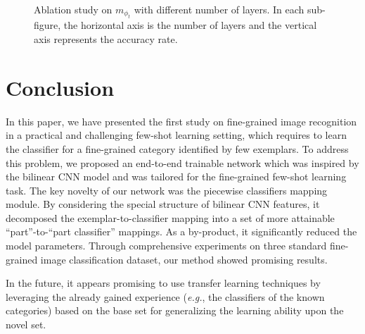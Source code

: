 \documentclass[10pt,twocolumn,letterpaper]{article}
\begin{document}
\begin{figure}[t]
 \centering
 \quad

 \quad

 \quad
 \caption{Ablation study on $m_{{\phi}_t}$ with different number of layers. In each sub-figure, the horizontal axis is the number of layers and the vertical axis represents the accuracy rate.} \label{fig:numlayers}
\end{figure}

\section{Conclusion}\label{sec:conclude}

In this paper, we have presented the first study on fine-grained image recognition in a practical and challenging few-shot learning setting, which requires to learn the classifier for a fine-grained category identified by few exemplars. To address this problem, we proposed an end-to-end trainable network which was inspired by the bilinear CNN model and was tailored for the fine-grained few-shot learning task. The key novelty of our network was the piecewise classifiers mapping module. By considering the special structure of bilinear CNN features, it decomposed the exemplar-to-classifier mapping into a set of more attainable ``part''-to-``part classifier'' mappings. As a by-product, it significantly reduced the model parameters. Through comprehensive experiments on three standard fine-grained image classification dataset, our method showed promising results.

In the future, it appears promising to use transfer learning techniques by leveraging the already gained experience (\emph{e.g.}, the classifiers of the known categories) based on the base set for generalizing the learning ability upon the novel set.


{\small


}
\end{document}
